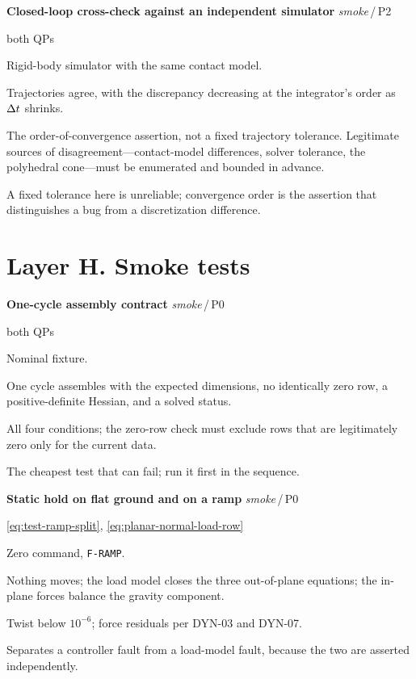 \documentclass[10pt]{article}
\newenvironment{testcard}[4]{%
  \par\medskip\noindent
  \tBlock{#1}\quad\textbf{#2}%
  \hfill{\small\textit{#3}\,/\,#4}\par\nopagebreak\vspace{2pt}
  \begin{description}[leftmargin=7.5em,style=sameline,itemsep=1pt,topsep=1pt]
}{%
  \end{description}\par\medskip
}
\begin{document}
\begin{testcard}{ORC-08}{Closed-loop cross-check against an independent simulator}{smoke}{P2}
  \item[Targets] both QPs
  \item[Regime] Rigid-body simulator with the same contact model.
  \item[Invariant] Trajectories agree, with the discrepancy decreasing at the
    integrator's order as $\Delta t$ shrinks.
  \item[Pass] The order-of-convergence assertion, not a fixed trajectory
    tolerance. Legitimate sources of disagreement---contact-model differences,
    solver tolerance, the polyhedral cone---must be enumerated and bounded in
    advance.
  \item[Diagnosis] A fixed tolerance here is unreliable; convergence order is
    the assertion that distinguishes a bug from a discretization difference.
\end{testcard}

\section{Layer H. Smoke tests}
\label{sec:test-layer-h}

\begin{testcard}{SMK-01}{One-cycle assembly contract}{smoke}{P0}
  \item[Targets] both QPs
  \item[Regime] Nominal fixture.
  \item[Invariant] One cycle assembles with the expected dimensions, no
    identically zero row, a positive-definite Hessian, and a solved status.
  \item[Pass] All four conditions; the zero-row check must exclude rows that
    are legitimately zero only for the current data.
  \item[Diagnosis] The cheapest test that can fail; run it first in the
    sequence.
\end{testcard}

\begin{testcard}{SMK-02}{Static hold on flat ground and on a ramp}{smoke}{P0}
  \item[Targets] \eqref{eq:test-ramp-split},
    \eqref{eq:planar-normal-load-row}
  \item[Regime] Zero command, \texttt{F-RAMP}.
  \item[Invariant] Nothing moves; the load model closes the three out-of-plane
    equations; the in-plane forces balance the gravity component.
  \item[Pass] Twist below $10^{-6}$\unitVelTS; force residuals per DYN-03 and
    DYN-07.
  \item[Diagnosis] Separates a controller fault from a load-model fault,
    because the two are asserted independently.
\end{testcard}
\end{document}
